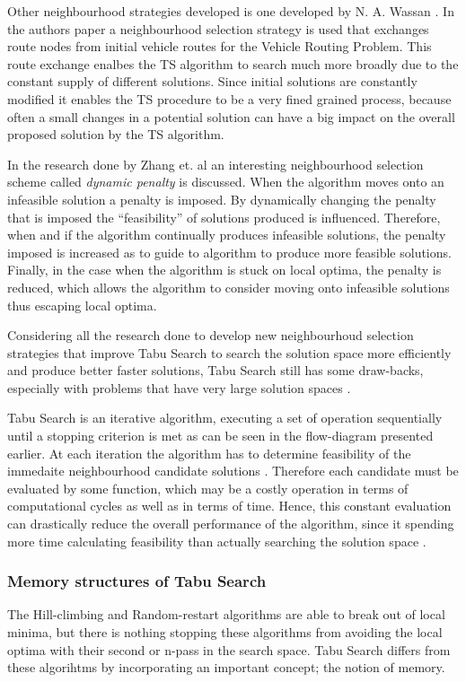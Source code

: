 Other neighbourhood strategies developed is one developed by N. A. Wassan \cite{ReactiveTabuVHR}. In the authors paper a neighbourhood selection strategy is used that exchanges route nodes from initial vehicle routes for the Vehicle Routing Problem. This route exchange enalbes the TS algorithm to search much more broadly due to the constant supply of different solutions. Since initial solutions are constantly modified it enables the TS procedure to be a very fined grained process, because often a small changes in a potential solution can have a big impact on the overall proposed solution by the TS algorithm.

In the research done by Zhang et. al \cite{TSHazardous} an interesting neighbourhood selection scheme called \emph{dynamic penalty} is discussed. When the algorithm moves onto an infeasible solution a penalty is imposed. By dynamically changing the penalty that is imposed the ``feasibility'' of solutions produced is influenced. Therefore, when and if the algorithm continually produces infeasible solutions, the penalty imposed is increased as to guide to algorithm to produce more feasible solutions. Finally, in the case when the algorithm is stuck on local optima, the penalty is reduced, which allows the algorithm to consider moving onto infeasible solutions thus escaping local optima.

Considering all the research done to develop new neighbourhoud selection strategies that improve Tabu Search to search the solution space more efficiently and produce better faster solutions, Tabu Search still has some draw-backs, especially with problems that have very large solution spaces \cite{EvoParallelTabu}.

Tabu Search is an iterative algorithm, executing a set of operation sequentially until a stopping criterion is met as can be seen in the flow-diagram presented earlier. At each iteration the algorithm has to determine feasibility of the immedaite neighbourhood candidate solutions \cite{EvoParallelTabu,TabuVechicleRoutingWithTimeWindows}. Therefore each candidate must be evaluated by some function, which may be a costly operation in terms of computational cycles as well as in terms of time. Hence, this constant evaluation can drastically reduce the overall performance of the algorithm, since it spending more time calculating feasibility than actually searching the solution space \cite{EvoParallelTabu,TabuVechicleRoutingWithTimeWindows}.

\subsubsection{Memory structures of Tabu Search}
The Hill-climbing and Random-restart algorithms are able to break out of local minima, but there is nothing stopping these algorithms from avoiding the local optima with their second or n-pass in the search space. Tabu Search differs from these algorihtms by incorporating an important concept; the notion of memory.


